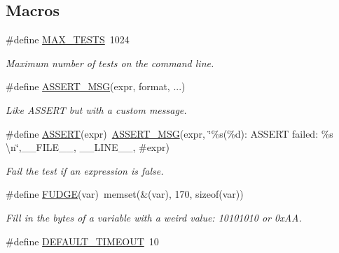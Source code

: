 \subsection*{Macros}
\begin{DoxyCompactItemize}
\item 
\#define \hyperlink{group__Testing_ga2a77d2f2c5b698c69c19e1f8782bf709}{M\+A\+X\+\_\+\+T\+E\+S\+TS}~1024\hypertarget{group__Testing_ga2a77d2f2c5b698c69c19e1f8782bf709}{}\label{group__Testing_ga2a77d2f2c5b698c69c19e1f8782bf709}

\begin{DoxyCompactList}\small\item\em Maximum number of tests on the command line. \end{DoxyCompactList}\item 
\#define \hyperlink{group__Testing_ga9be407f8744aff436633d34c62591cb9}{A\+S\+S\+E\+R\+T\+\_\+\+M\+SG}(expr,  format, ...)
\begin{DoxyCompactList}\small\item\em Like A\+S\+S\+E\+RT but with a custom message. \end{DoxyCompactList}\item 
\#define \hyperlink{group__Testing_ga28301f76c53b643912da7c538f74e2c6}{A\+S\+S\+E\+RT}(expr)~\hyperlink{group__Testing_ga9be407f8744aff436633d34c62591cb9}{A\+S\+S\+E\+R\+T\+\_\+\+M\+SG}(expr, \char`\"{}\%s(\%d)\+: A\+S\+S\+E\+RT failed\+: \%s \textbackslash{}n\char`\"{},\+\_\+\+\_\+\+F\+I\+L\+E\+\_\+\+\_\+, \+\_\+\+\_\+\+L\+I\+N\+E\+\_\+\+\_\+, \#expr)
\begin{DoxyCompactList}\small\item\em Fail the test if an expression is false. \end{DoxyCompactList}\item 
\#define \hyperlink{group__Testing_ga1ac76218e138d4f495b9a695c5da5b9b}{F\+U\+D\+GE}(var)~memset(\&(var), 170, sizeof(var))\hypertarget{group__Testing_ga1ac76218e138d4f495b9a695c5da5b9b}{}\label{group__Testing_ga1ac76218e138d4f495b9a695c5da5b9b}

\begin{DoxyCompactList}\small\item\em Fill in the bytes of a variable with a weird value\+: 10101010 or 0x\+AA. \end{DoxyCompactList}\item 
\#define \hyperlink{group__Testing_gaad2dd72565852b91c809cd4685833b17}{D\+E\+F\+A\+U\+L\+T\+\_\+\+T\+I\+M\+E\+O\+UT}~10\hypertarget{group__Testing_gaad2dd72565852b91c809cd4685833b17}{}\label{group__Testing_gaad2dd72565852b91c809cd4685833b17}


\end{DoxyCompactItemize}
